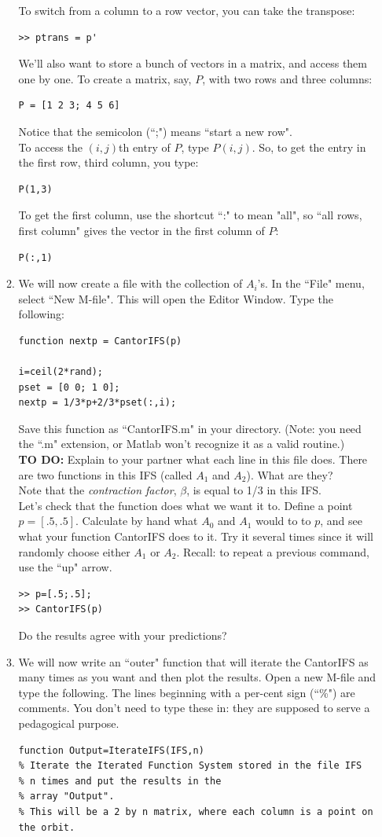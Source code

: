 \documentclass[12pt]{article}
\begin{document}
\begin{enumerate}
\begin{enumerate}
To switch from a column to a row vector, you can take the transpose:
\begin{verbatim}
>> ptrans = p'
\end{verbatim}
We'll also want to store a bunch of vectors in a matrix, and access them one by one.  To create a matrix, say, $P$, with
two rows and three columns:
\begin{verbatim}
P = [1 2 3; 4 5 6]
\end{verbatim}
Notice that the semicolon (``;") means ``start a new row".\\
To access the $(i,j)$th entry of $P$, type $P(i,j)$.  So, to get the entry in the first row, third column, you type:
\begin{verbatim}
P(1,3)
\end{verbatim}
To get the first column, use the shortcut ``:" to mean "all", so ``all rows, first column" gives the vector in the first column of $P$:
\begin{verbatim}
P(:,1)
\end{verbatim}
\item We will now create a file with the collection of $A_i$'s.  In the ``File" menu, select ``New M-file".  This will open the Editor Window.  Type the following:
\begin{verbatim}
function nextp = CantorIFS(p)

i=ceil(2*rand);
pset = [0 0; 1 0];
nextp = 1/3*p+2/3*pset(:,i);
\end{verbatim}
Save this function as ``CantorIFS.m" in your directory.  (Note: you need the ``.m" extension, or Matlab won't recognize it as a valid routine.)\\
{\bf TO DO:} Explain to your partner what each line in this file does.  There are two functions in this IFS (called $A_1$ and $A_2$).  What are they?\\
Note that the {\it contraction factor}, $\beta$, is equal to 1/3 in this IFS.\\
Let's check that the function does what we want it to.  Define a point $p = [.5, .5]$.  Calculate by hand what $A_0$ and $A_1$ would to to $p$, and see what your 
function CantorIFS does to it.  Try it several times since it will randomly choose either $A_1$ or $A_2$.    Recall: to repeat a previous command, use the ``up" arrow.
\begin{verbatim}
>> p=[.5;.5];
>> CantorIFS(p)
\end{verbatim}
Do the results agree with your predictions?
\item We will now write an ``outer" function that will iterate the CantorIFS as many times as you want and then plot the results.  Open a new M-file and type the following.
The lines beginning with a per-cent sign (``\%") are comments.  You don't need to type these in: they are supposed to serve a pedagogical purpose.
\begin{verbatim}
function Output=IterateIFS(IFS,n)
% Iterate the Iterated Function System stored in the file IFS
% n times and put the results in the
% array "Output".  
% This will be a 2 by n matrix, where each column is a point on the orbit.


\end{verbatim}
\end{enumerate}
\end{enumerate}
\end{document}
